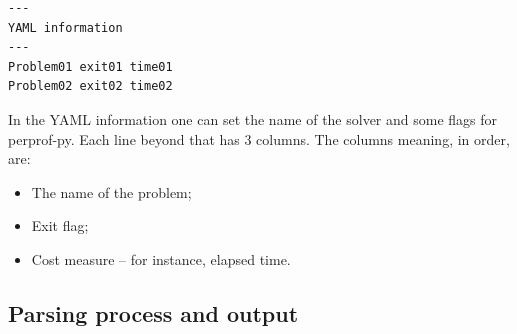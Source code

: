     \begin{verbatim}
---
YAML information
---
Problem01 exit01 time01
Problem02 exit02 time02
    \end{verbatim}

    In the YAML information one can set the name of the solver and some
    flags for perprof-py.
    Each line beyond that has 3 columns. The columns meaning, in order, are:
    \begin{itemize}
      \item The name of the problem;
      \item Exit flag;
      \item Cost measure -- for instance, elapsed time.
    \end{itemize}

\subsection*{Parsing process and output}

